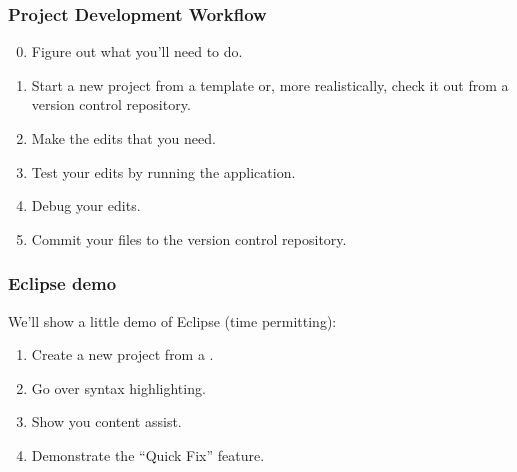 \begin{frame}
\frametitle{Project Development Workflow}

\begin{changemargin}{1cm}
\Large
\begin{enumerate}
\setcounter{enumi}{-1}
\item Figure out what you'll need to do.
\item Start a new project from a template or, more realistically,
  check it out from a version control repository.
\item Make the edits that you need. 
\item Test your edits by running the application.
\item Debug your edits.
\item Commit your files to the version control repository.
\end{enumerate}
\end{changemargin}
\end{frame}

\begin{frame}
\frametitle{Eclipse demo}

\begin{changemargin}{1cm}
We'll show a little demo of Eclipse (time permitting):
\Large
\begin{enumerate}
	\item Create a new project from a .
	\item Go over syntax highlighting.
	\item Show you content assist.
	\item Demonstrate the ``Quick Fix'' feature.
\end{enumerate}
\end{changemargin}

\end{frame}




